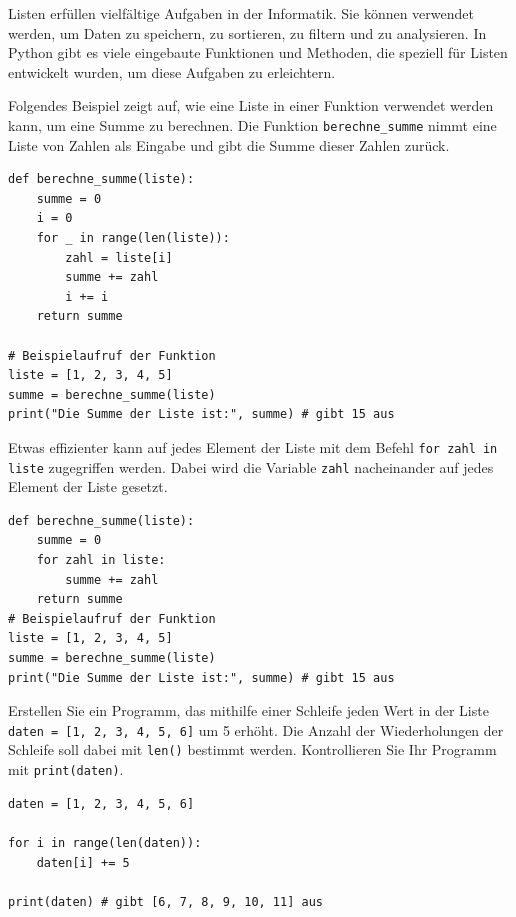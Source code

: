 Listen erfüllen vielfältige Aufgaben in der Informatik. Sie können verwendet werden, um Daten zu speichern, zu sortieren, zu filtern und zu analysieren. In Python gibt es viele eingebaute Funktionen und Methoden, die speziell für Listen entwickelt wurden, um diese Aufgaben zu erleichtern.
\begin{myexample}
Folgendes Beispiel zeigt auf, wie eine Liste in einer Funktion verwendet werden kann, um eine Summe zu berechnen. Die Funktion \lstinline|berechne_summe| nimmt eine Liste von Zahlen als Eingabe und gibt die Summe dieser Zahlen zurück.
\begin{lstlisting}
def berechne_summe(liste):
    summe = 0
    i = 0
    for _ in range(len(liste)):
        zahl = liste[i]
        summe += zahl
        i += i
    return summe

# Beispielaufruf der Funktion
liste = [1, 2, 3, 4, 5]
summe = berechne_summe(liste)
print("Die Summe der Liste ist:", summe) # gibt 15 aus
\end{lstlisting}
\end{myexample}

Etwas effizienter kann auf jedes Element der Liste mit dem Befehl \lstinline|for zahl in liste| zugegriffen werden. Dabei wird die Variable \lstinline|zahl| nacheinander auf jedes Element der Liste gesetzt.
\begin{lstlisting}
def berechne_summe(liste):
    summe = 0
    for zahl in liste:
        summe += zahl
    return summe
# Beispielaufruf der Funktion
liste = [1, 2, 3, 4, 5]
summe = berechne_summe(liste)
print("Die Summe der Liste ist:", summe) # gibt 15 aus
\end{lstlisting}

\begin{myexercise}
    Erstellen Sie ein Programm, das mithilfe einer Schleife jeden Wert in der Liste \lstinline|daten = [1, 2, 3, 4, 5, 6]| um 5 erhöht. Die Anzahl der Wiederholungen der Schleife soll dabei mit \lstinline|len()| bestimmt werden. Kontrollieren Sie Ihr Programm mit \lstinline|print(daten)|.

    \begin{myanswer}
        \begin{lstlisting}
daten = [1, 2, 3, 4, 5, 6]

for i in range(len(daten)):
    daten[i] += 5

print(daten) # gibt [6, 7, 8, 9, 10, 11] aus
\end{lstlisting}
    \end{myanswer}
\end{myexercise}



